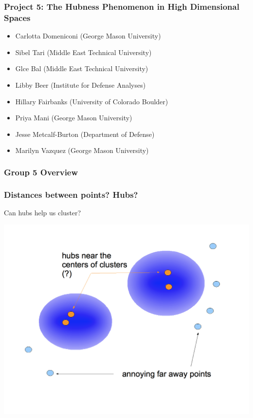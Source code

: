 \documentclass{beamer}
\begin{document}
\begin{frame}
\frametitle{Project 5: The Hubness Phenomenon in High Dimensional Spaces}

\begin{itemize}
\item Carlotta Domeniconi (George Mason University)
\item Sibel Tari (Middle East Technical University)
\end{itemize}

\begin{itemize}
\item Glce Bal (Middle East Technical University)
\item Libby Beer (Institute for Defense Analyses)
\item Hillary Fairbanks (University of Colorado Boulder)
\item Priya Mani (George Mason University)
\item Jesse Metcalf-Burton (Department of Defense)
\item Marilyn Vazquez (George Mason University)
\end{itemize}
\end{frame}


\begin{frame}
\frametitle{Group 5 Overview}

\end{frame}







\begin{frame}
\frametitle{Distances between points? Hubs?}

Can hubs help us cluster?

\centering
\includegraphics[width=.9\textwidth]{fig/hubness_sketch.png}



\end{frame}
\end{document}
